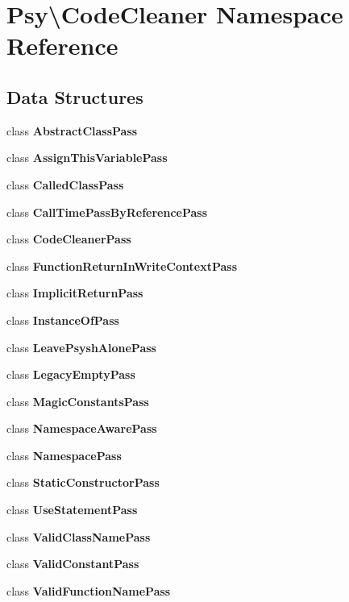 \section{Psy\textbackslash{}Code\+Cleaner Namespace Reference}
\label{namespace_psy_1_1_code_cleaner}
\subsection*{Data Structures}
\begin{DoxyCompactItemize}
\item 
class {\bf Abstract\+Class\+Pass}
\item 
class {\bf Assign\+This\+Variable\+Pass}
\item 
class {\bf Called\+Class\+Pass}
\item 
class {\bf Call\+Time\+Pass\+By\+Reference\+Pass}
\item 
class {\bf Code\+Cleaner\+Pass}
\item 
class {\bf Function\+Return\+In\+Write\+Context\+Pass}
\item 
class {\bf Implicit\+Return\+Pass}
\item 
class {\bf Instance\+Of\+Pass}
\item 
class {\bf Leave\+Psysh\+Alone\+Pass}
\item 
class {\bf Legacy\+Empty\+Pass}
\item 
class {\bf Magic\+Constants\+Pass}
\item 
class {\bf Namespace\+Aware\+Pass}
\item 
class {\bf Namespace\+Pass}
\item 
class {\bf Static\+Constructor\+Pass}
\item 
class {\bf Use\+Statement\+Pass}
\item 
class {\bf Valid\+Class\+Name\+Pass}
\item 
class {\bf Valid\+Constant\+Pass}
\item 
class {\bf Valid\+Function\+Name\+Pass}
\end{DoxyCompactItemize}
